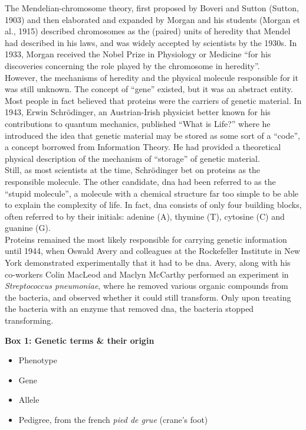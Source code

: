 The Mendelian-chromosome theory, first proposed by Boveri and Sutton (Sutton, 1903) and then elaborated and expanded by Morgan and his students (Morgan et al., 1915) described chromosomes as the (paired) units of heredity that Mendel had described in his laws, and was widely accepted by scientists by the 1930s. 
In 1933, Morgan received the Nobel Prize in Physiology or Medicine “for his discoveries concerning the role played by the chromosome in heredity”.\\

However, the mechanisms of heredity and the physical molecule responsible for it was still unknown. 
The concept of “gene” existed, but it was an abstract entity. 
Most people in fact believed that proteins were the carriers of genetic material. 
In 1943, Erwin  Schrödinger, an Austrian-Irish physicist better known for his contributions to quantum mechanics, published “What is Life?” where he introduced the idea that genetic material may be stored as some sort of a “code”, a concept borrowed from Information Theory. 
He had provided a theoretical physical description of the mechanism of “storage” of genetic material.\\ 

Still, as most scientists at the time, Schrödinger bet on proteins as the responsible molecule. 
The other candidate, \gls{dna} had been referred to as the “stupid molecule”, a molecule with a chemical structure far too simple to be able to explain the complexity of life. 
In fact, \gls{dna} consists of only four building blocks, often referred to by their initials: adenine (A), thymine (T), cytosine (C) and guanine (G).\\

Proteins remained the most likely responsible for carrying genetic information until 1944, when Oswald Avery and colleagues at the Rockefeller Institute in New York demonstrated experimentally that it had to be \gls{dna}. 
Avery, along with his co-workers Colin MacLeod and Maclyn McCarthy performed an experiment in \textit{Streptococcus pneumoniae}, where he removed various organic compounds from the bacteria, and observed whether it could still transform. 
Only upon treating the bacteria with an enzyme that removed \gls{dna}, the bacteria stopped transforming.\\


\begin{Comment}
\hspace{-2.5mm}\textbf{Box 1: Genetic terms \& their origin}\label{box1}
\begin{itemize}
    \item Phenotype
    \item Gene
    \item Allele
    \item Pedigree, from the french \textit{pied de grue} (crane's foot)

\end{itemize}


\end{Comment}


